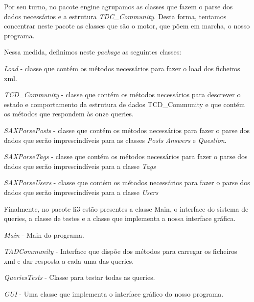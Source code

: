 \documentclass[a4paper]{article}
\begin{document}
Por seu turno, no pacote engine agrupamos as classes que fazem o parse dos
dados necessários e a estrutura \textit{TDC\_Community}. Desta forma, tentamos
concentrar neste pacote as classes que são o motor, que põem em marcha,
o nosso programa.\par
Nessa medida, definimos neste \textit{package} as seguintes classes:
\begin{itemize}
\begin{item} \textit{Load} - classe que contém os métodos necessários para fazer
o load dos ficheiros xml.\end{item}
\begin{item} \textit{TCD\_Community} - classe que contém os métodos necessários
para descrever o estado e comportamento da estrutura de dados TCD\_Community e
que contém os métodos que respondem às onze queries.\end{item}
\begin{item} \textit{SAXParsePosts} - classe que contém os métodos necessários
para fazer o parse dos dados que serão imprescindíveis para as classes
\textit{Posts} \textit{Answers} e \textit{Question}.\end{item}
\begin{item} \textit{SAXParseTags} - classe que contém os métodos necessários
para fazer o parse dos dados que serão imprescindíveis para a classe
\textit{Tags}\end{item}
\begin{item} \textit{SAXParseUsers} - classe que contém os métodos necessários
para fazer o parse dos dados que serão imprescindíveis para a classe
\textit{Users}\end{item}
\end{itemize}


Finalmente, no pacote li3 estão presentes a classe Main, o interface do sistema de
queries, a classe de testes e a classe que implementa a nossa interface gráfica.
\begin{itemize}
\begin{item} \textit{Main} - Main do programa.\end{item}
\begin{item} \textit{TADCommunity} - Interface que dispõe dos métodos para carregar
os ficheiros xml e dar resposta a cada uma das queries.\end{item}
\begin{item} \textit{QueriesTests} - Classe para testar todas as queries.\end{item}
\begin{item} \textit{GUI} - Uma classe que implementa o interface gráfico do nosso programa.\end{item}
\end{itemize}
\end{document}
